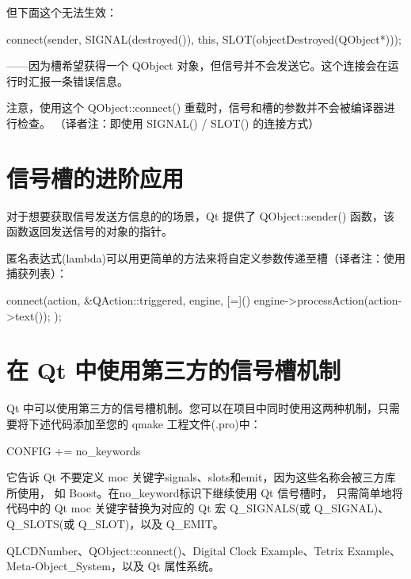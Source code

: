 但下面这个无法生效：

\begin{cppcode}
connect(sender, SIGNAL(destroyed()), this, SLOT(objectDestroyed(QObject*)));
\end{cppcode}

——因为槽希望获得一个 QObject 对象，但信号并不会发送它。这个连接会在运行时汇报一条错误信息。

\begin{notice}
注意，使用这个 QObject::connect() 重载时，信号和槽的参数并不会被编译器进行检查。
（译者注：即使用 SIGNAL() / SLOT() 的连接方式）
\end{notice}

\section{信号槽的进阶应用}

对于想要获取信号发送方信息的的场景，Qt 提供了 QObject::sender() 函数，该函数返回发送信号的对象的指针。

匿名表达式(lambda)可以用更简单的方法来将自定义参数传递至槽（译者注：使用捕获列表）：

\begin{cppcode}
connect(action, &QAction::triggered, engine,
         [=]() { engine->processAction(action->text()); });
\end{cppcode}


\section{在 Qt 中使用第三方的信号槽机制}

Qt 中可以使用第三方的信号槽机制。您可以在项目中同时使用这两种机制，只需要将下述代码添加至您的 qmake 工程文件(.pro)中：

\begin{cppcode}
CONFIG += no_keywords
\end{cppcode}

它告诉 Qt 不要定义 moc 关键字signals、slots和emit，因为这些名称会被三方库所使用，
如 Boost。在no\_keyword标识下继续使用 Qt 信号槽时，
只需简单地将代码中的 Qt moc 关键字替换为对应的 Qt 宏 Q\_SIGNALS(或 Q\_SIGNAL)、Q\_SLOTS(或 Q\_SLOT)，以及 Q\_EMIT。

\begin{seeAlso}
QLCDNumber、QObject::connect()、Digital Clock Example、Tetrix Example、Meta-Object\_System，以及 Qt 属性系统。
\end{seeAlso}